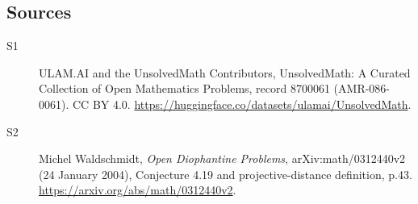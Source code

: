 \documentclass[11pt]{article}
\begin{document}
\subsection{Sources}
\begin{description}
\item[\hypertarget{source:8700061:1}{S1}] ULAM.AI and the UnsolvedMath Contributors, UnsolvedMath: A Curated Collection of Open Mathematics Problems, record 8700061 (AMR-086-0061). CC BY 4.0. \url{https://huggingface.co/datasets/ulamai/UnsolvedMath}.
\item[\hypertarget{source:8700061:2}{S2}] Michel Waldschmidt, \emph{Open Diophantine Problems}, arXiv:math/0312440v2 (24 January 2004), Conjecture 4.19 and projective-distance definition, p.43. \url{https://arxiv.org/abs/math/0312440v2}.
\end{description}
\label{end:8700061}
\end{document}
